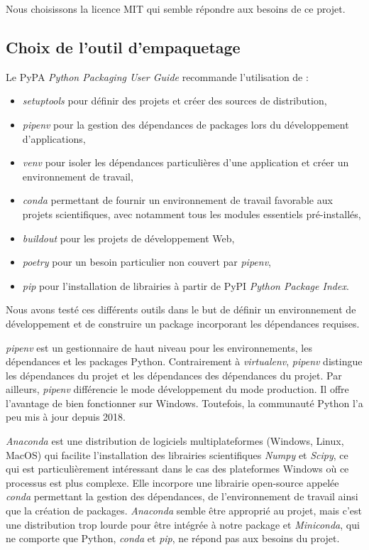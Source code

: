 \documentclass[twoside,a4paper,11pt,frenchb,openany]{report}
\begin{document}
Nous choisissons la licence MIT qui semble répondre aux besoins de ce projet.

	

\subsection{Choix de l'outil d'empaquetage}
	
	Le PyPA \textit{Python Packaging User Guide} recommande l'utilisation de :
\begin{itemize}
\item \textit{setuptools} pour définir des projets et créer des sources de distribution,
\item \textit{pipenv} pour la gestion des dépendances de packages lors du développement d'applications,
\item \textit{venv} pour isoler les dépendances particulières d'une application et créer un environnement de travail,
\item \textit{conda} permettant de fournir un environnement de travail favorable aux projets scientifiques, avec notamment tous les modules essentiels pré-installés,
\item \textit{buildout} pour les projets de développement Web,
\item \textit{poetry} pour un besoin particulier non couvert par \textit{pipenv},
\item \textit{pip} pour l'installation de librairies à partir de PyPI \textit{Python Package Index}.
\end{itemize}

Nous avons testé ces différents outils dans le but de définir un environnement de développement et de construire un package incorporant les dépendances requises.

\textit{pipenv} est un gestionnaire de haut niveau pour les environnements, les dépendances et les packages Python. Contrairement à \textit{virtualenv}, \textit{pipenv} distingue les dépendances du projet et les dépendances des dépendances du projet. Par ailleurs, \textit{pipenv} différencie le mode développement du mode production. Il offre l'avantage de bien fonctionner sur Windows. Toutefois, la communauté Python l'a peu mis à jour depuis 2018.

\textit{Anaconda} est une distribution de logiciels multiplateformes (Windows, Linux, MacOS) qui facilite l'installation des librairies scientifiques \textit{Numpy} et \textit{Scipy}, ce qui est particulièrement intéressant dans le cas des plateformes Windows où ce processus est plus complexe. Elle incorpore une librairie open-source appelée \textit{conda} permettant la gestion des dépendances, de l'environnement de travail ainsi que la création de packages. \textit{Anaconda} semble être approprié au projet, mais c'est une distribution trop lourde pour être intégrée à notre package et \textit{Miniconda}, qui ne comporte que Python, \textit{conda} et \textit{pip}, ne répond pas aux besoins du projet.
\end{document}
